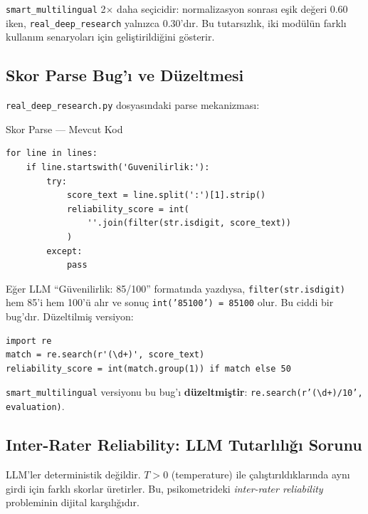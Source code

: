 \begin{dikkat}
\texttt{smart\_multilingual} 2$\times$ daha se\c{c}icidir: normalizasyon sonras{\i} e\c{s}ik de\u{g}eri 0.60 iken, \texttt{real\_deep\_research} yaln{\i}zca 0.30'd{\i}r. Bu tutars{\i}zl{\i}k, iki modülün farkl{\i} kullan{\i}m senaryolar{\i} i\c{c}in geli\c{s}tirildi\u{g}ini g\"{o}sterir.
\end{dikkat}

\subsection{Skor Parse Bug'{\i} ve D\"{u}zeltmesi}

\texttt{real\_deep\_research.py} dosyas{\i}ndaki parse mekanizmas{\i}:

\begin{kodref}{Skor Parse --- Mevcut Kod}
\begin{lstlisting}
for line in lines:
    if line.startswith('Guvenilirlik:'):
        try:
            score_text = line.split(':')[1].strip()
            reliability_score = int(
                ''.join(filter(str.isdigit, score_text))
            )
        except:
            pass
\end{lstlisting}
\end{kodref}

\begin{dikkat}
E\u{g}er LLM ``G\"{u}venilirlik: 85/100'' format{\i}nda yazd{\i}ysa, \texttt{filter(str.isdigit)} hem 85'i hem 100'\"{u} al{\i}r ve sonu\c{c} \texttt{int('85100') = 85100} olur. Bu ciddi bir bug'd{\i}r. D\"{u}zeltilmi\c{s} versiyon:
\begin{lstlisting}
import re
match = re.search(r'(\d+)', score_text)
reliability_score = int(match.group(1)) if match else 50
\end{lstlisting}
\texttt{smart\_multilingual} versiyonu bu bug'{\i} \textbf{d\"{u}zeltmi\c{s}tir}: \texttt{re.search(r'(\textbackslash d+)/10', evaluation)}.
\end{dikkat}

\subsection{Inter-Rater Reliability: LLM Tutarl{\i}l{\i}\u{g}{\i} Sorunu}

LLM'ler deterministik de\u{g}ildir. $T > 0$ (temperature) ile \c{c}al{\i}\c{s}t{\i}r{\i}ld{\i}klar{\i}nda ayn{\i} girdi i\c{c}in farkl{\i} skorlar \"{u}retirler. Bu, psikometrideki \emph{inter-rater reliability} probleminin dijital kar\c{s}{\i}l{\i}\u{g}{\i}d{\i}r.

